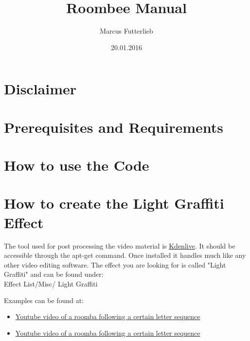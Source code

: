 \documentclass[a4paper,10pt]{book}
\title{Roombee Manual}
\author{Marcus Futterlieb}
\date{20.01.2016}
\begin{document}
\dominitoc
\maketitle

\chapter{Disclaimer}
\chapter{Prerequisites and Requirements}
\chapter{How to use the Code}
\chapter{How to create the Light Graffiti Effect}
The tool used for post processing the video material is \href{https://kdenlive.org/}{Kdenlive}.
It should be accessible through the apt-get command.
Once installed it handles much like any other video editing software.
The effect you are looking for is called "Light Graffiti" and can be found under:\\
Effect List/Misc/ Light Graffiti

\vspace {0.5cm}

Examples can be found at:


\begin{itemize}
  \item \href{https://youtu.be/hPpPM0kasyk}{Youtube video of a roomba following a certain letter sequence}
  \item \href{https://youtu.be/g-6yrYu4PUs}{Youtube video of a roomba following a certain letter sequence}
\end{itemize}
\end{document}
